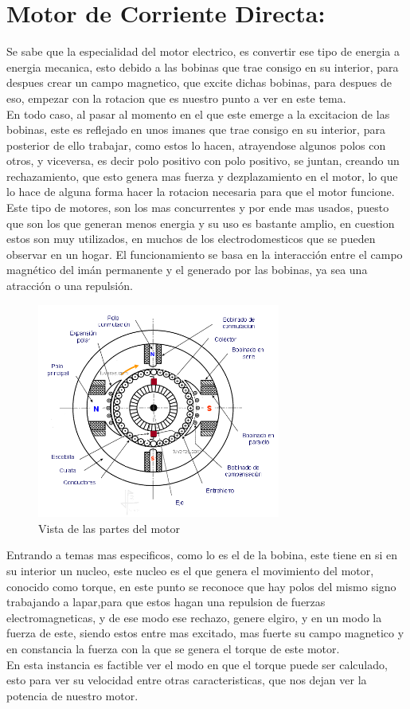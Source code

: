 \documentclass[12pt,a4paper]{article}
\begin{document}
\section{Motor de Corriente Directa:}

Se sabe que la especialidad del motor electrico, es convertir ese tipo de energia a energia mecanica, esto debido a las bobinas que trae consigo en su interior, para despues crear un campo magnetico, que excite dichas bobinas, para despues de eso, empezar con la rotacion que es nuestro punto a ver en este tema.\\
En todo caso, al pasar al momento en el que este emerge a la excitacion de las bobinas, este es reflejado en unos imanes que trae consigo en su interior, para posterior de ello trabajar, como estos lo hacen, atrayendose algunos polos con otros, y viceversa, es decir polo positivo con polo positivo, se juntan, creando un rechazamiento, que esto genera mas fuerza y dezplazamiento en el motor, lo que lo hace de alguna forma hacer la rotacion necesaria para que el motor funcione.\\
Este tipo de motores, son los mas concurrentes y por ende mas usados, puesto que son los que generan menos energia y su uso es bastante amplio, en cuestion estos son muy utilizados, en muchos de los electrodomesticos que se pueden observar en un hogar. El funcionamiento se basa en la interacción entre el campo magnético del imán permanente y el generado por las bobinas, ya sea una atracción o una repulsión.\\

\begin{figure}[hbtp]
\centering
\includegraphics[width=8cm]{Motor2.png}
\caption{Vista de las partes del motor}
\end{figure}


Entrando a temas mas especificos, como lo es el de la bobina, este tiene en si en su interior un nucleo, este nucleo es el que genera el movimiento del motor, conocido como torque, en este punto se reconoce que hay polos del mismo signo trabajando a lapar,para que estos hagan una repulsion de fuerzas electromagneticas, y de ese modo ese rechazo, genere elgiro, y en un modo la fuerza de este, siendo estos entre mas excitado, mas fuerte su campo magnetico y en constancia la fuerza con la que se genera el torque de este motor.\\
En esta instancia es factible ver el modo en que el torque puede ser calculado, esto para ver su velocidad entre otras caracteristicas, que nos dejan ver la potencia de nuestro motor.\\
\end{document}
